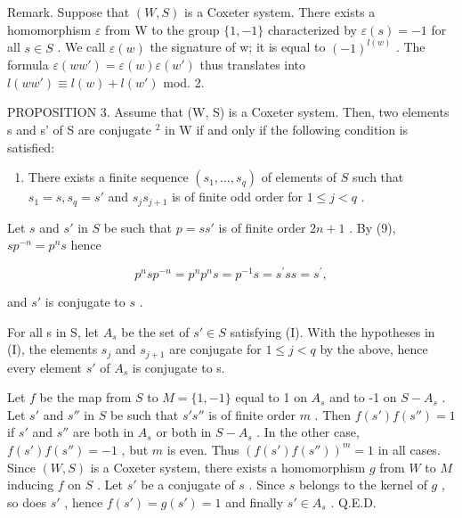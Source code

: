 Remark. Suppose that \((W,S)\) is a Coxeter system. There exists a homomorphism \(\varepsilon\) from W to the group \(\{1,-1\}\) characterized by \(\varepsilon(s)=-1\) for all \(s\in S\) . We call \(\varepsilon(w)\) the signature of w; it is equal to \((-1)^{l(w)}\) . The formula \(\varepsilon(ww')=\varepsilon(w)\varepsilon(w')\) thus translates into \(l(ww')\equiv l(w)+l(w')\) mod. 2.

PROPOSITION 3. Assume that (W, S) is a Coxeter system. Then, two elements s and s' of S are conjugate \(^{2}\) in W if and only if the following condition is satisfied:

\begin{enumerate}
\def\labelenumi{(\Roman{enumi})}
\tightlist
\item
  There exists a finite sequence \((s_1, \ldots, s_q)\) of elements of \(S\) such that \(s_1 = s, s_q = s'\) and \(s_j s_{j+1}\) is of finite odd order for \(1 \leqslant j < q\) .
\end{enumerate}

Let \(s\) and \(s'\) in \(S\) be such that \(p = ss'\) is of finite order \(2n + 1\) . By (9), \(sp^{-n} = p^n s\) hence

\[
p ^ {n} s p ^ {- n} = p ^ {n} p ^ {n} s = p ^ {- 1} s = s ^ {\prime} s s = s ^ {\prime},\tag{10}
\]

and \(s'\) is conjugate to \(s\) .

For all s in S, let \(A_{s}\) be the set of \(s' \in S\) satisfying (I). With the hypotheses in (I), the elements \(s_{j}\) and \(s_{j+1}\) are conjugate for \(1 \leqslant j < q\) by the above, hence every element \(s'\) of \(A_{s}\) is conjugate to s.

Let \(f\) be the map from \(S\) to \(M = \{1, -1\}\) equal to 1 on \(A_s\) and to -1 on \(S - A_s\) . Let \(s'\) and \(s''\) in \(S\) be such that \(s's''\) is of finite order \(m\) . Then \(f(s')f(s'') = 1\) if \(s'\) and \(s''\) are both in \(A_s\) or both in \(S - A_s\) . In the other case, \(f(s')f(s'') = -1\) , but \(m\) is even. Thus \((f(s')f(s''))^m = 1\) in all cases. Since \((W, S)\) is a Coxeter system, there exists a homomorphism \(g\) from \(W\) to \(M\) inducing \(f\) on \(S\) . Let \(s'\) be a conjugate of \(s\) . Since \(s\) belongs to the kernel of \(g\) , so does \(s'\) , hence \(f(s') = g(s') = 1\) and finally \(s' \in A_s\) . Q.E.D.

